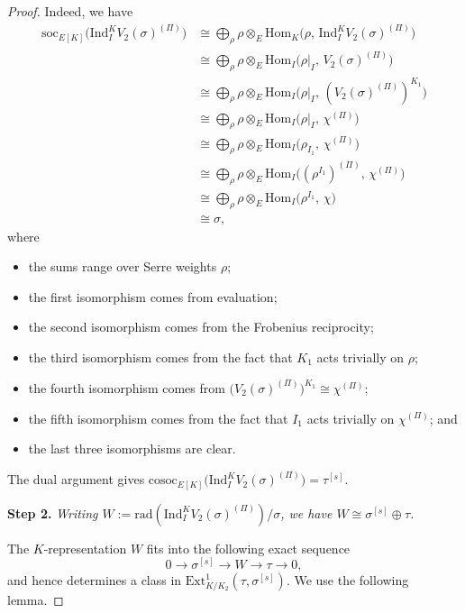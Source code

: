\documentclass[a4paper,10pt,twoside]{amsart}
\theoremstyle{definition}
\numberwithin{equation}{section}
\begin{document}
\begin{proof}
\medskip
Indeed, we have
\begin{align*}
\mathrm{soc}_{E[K]}\bigl(\mathrm{Ind}_I^K V_2(\sigma)^{(\Pi)}\bigr)
&\cong \bigoplus_{\rho} \rho \otimes_E \mathrm{Hom}_K\bigl(\rho,\, \mathrm{Ind}_I^K V_2(\sigma)^{(\Pi)}\bigr) \\
&\cong \bigoplus_{\rho} \rho \otimes_E \mathrm{Hom}_I\bigl(\rho|_I,\, V_2(\sigma)^{(\Pi)}\bigr) \\
&\cong \bigoplus_{\rho} \rho \otimes_E \mathrm{Hom}_I\bigl(\rho|_I,\, (V_2(\sigma)^{(\Pi)})^{K_1}\bigr) \\
&\cong \bigoplus_{\rho} \rho\otimes_E \mathrm{Hom}_I\bigl(\rho|_I,\, \chi^{(\Pi)}\bigr) \\
&\cong \bigoplus_{\rho} \rho\otimes_E \mathrm{Hom}_I\bigl(\rho_{I_1},\, \chi^{(\Pi)}\bigr) \\
&\cong \bigoplus_{\rho} \rho\otimes_E \mathrm{Hom}_I\bigl((\rho^{I_1})^{(\Pi)},\, \chi^{(\Pi)}\bigr) \\
&\cong \bigoplus_{\rho} \rho\otimes_E \mathrm{Hom}_I\bigl(\rho^{I_1},\, \chi\bigr) \\
&\cong \sigma,
\end{align*} 
where 
\begin{itemize}
\item the sums range over Serre weights $\rho$; 
\item the first isomorphism comes from evaluation; 
\item the second isomorphism comes from the Frobenius reciprocity; 
\item the third isomorphism comes from the fact that $K_1$ acts trivially on
$\rho$; 
\item the fourth isomorphism comes from $\bigl(V_2(\sigma)^{(\Pi)}\bigr)^{K_1} \cong \chi^{(\Pi)}$; 
\item the fifth isomorphism comes from the fact that $I_1$ acts trivially on $\chi^{(\Pi)}$; and
\item the last three isomorphisms are clear. 
\end{itemize}

The dual argument gives $\mathrm{cosoc}_{E[K]}\bigl(\mathrm{Ind}_I^K
V_2(\sigma)^{(\Pi)}\bigr) = \tau^{[s]}$.

\medskip
\noindent\textbf{Step 2.}
\textit{Writing $W := \mathrm{rad}(\mathrm{Ind}_I^K V_2(\sigma)^{(\Pi)})/\sigma$,
we have $W \cong \sigma^{[s]} \oplus \tau$.}

\medskip
The $K$-representation $W$ fits into the following exact sequence
\[
0 \longrightarrow \sigma^{[s]} \longrightarrow W \longrightarrow \tau \longrightarrow 0,
\]
and hence determines a class in $\mathrm{Ext}^1_{K/K_2}(\tau,
\sigma^{[s]})$. We use the following lemma.


\end{proof}
\end{document}
